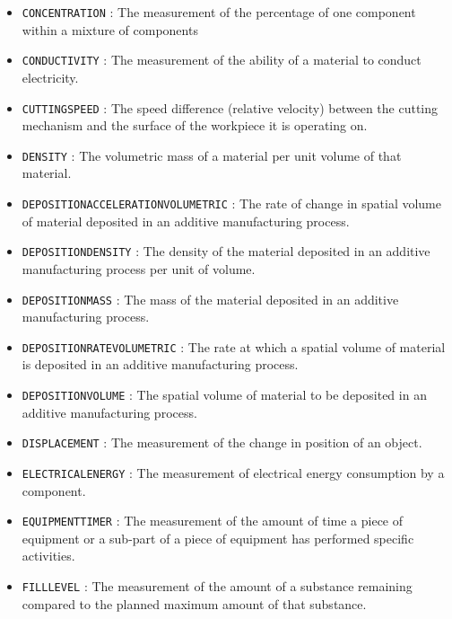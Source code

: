 \begin{itemize}
\item \texttt{CONCENTRATION} : The measurement of the percentage of one component within a mixture of components 

\item \texttt{CONDUCTIVITY} : The measurement of the ability of a material to conduct electricity. 

\item \texttt{CUTTING\textunderscore SPEED} : The speed difference (relative velocity) between the cutting mechanism and the surface of the workpiece it is operating on. 

\item \texttt{DENSITY} : The volumetric mass of a material per unit volume of that material. 

\item \texttt{DEPOSITION\textunderscore ACCELERATION\textunderscore VOLUMETRIC} : The rate of change in spatial volume of material deposited in an additive manufacturing process. 

\item \texttt{DEPOSITION\textunderscore DENSITY} : The density of the material deposited in an additive manufacturing process per unit of volume. 

\item \texttt{DEPOSITION\textunderscore MASS} : The mass of the material deposited in an additive manufacturing process. 

\item \texttt{DEPOSITION\textunderscore RATE\textunderscore VOLUMETRIC} : The rate at which a spatial volume of material is deposited in an additive manufacturing process. 

\item \texttt{DEPOSITION\textunderscore VOLUME} : The spatial volume of material to be deposited in an additive manufacturing process. 

\item \texttt{DISPLACEMENT} : The measurement of the change in position of an object. 

\item \texttt{ELECTRICAL\textunderscore ENERGY} : The measurement of electrical energy consumption by a component. 

\item \texttt{EQUIPMENT\textunderscore TIMER} : The measurement of the amount of time a piece of equipment or a sub-part of a piece of equipment has performed specific activities. 

\item \texttt{FILL\textunderscore LEVEL} : The measurement of the amount of a substance remaining compared to the planned maximum amount of that substance. 


\end{itemize}
